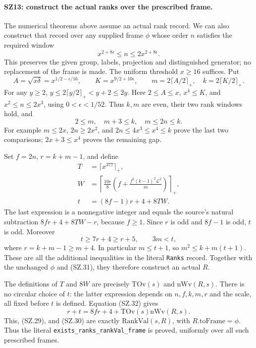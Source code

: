 \documentclass[11pt,a4paper]{article}
\numberwithin{equation}{section}
\theoremstyle{remark}\newtheorem{remark}[theorem]{Remark}
\begin{document}
\paragraph{SZ13: construct the actual ranks over the prescribed frame.}
The numerical theorems above assume an actual rank record. We can also
construct that record over any supplied frame $\phi$ whose order $n$
satisfies the required window
\[
             x^{2+8\epsilon}\leq n\leq2x^{2+8\epsilon}.
                                                                    \tag{SZ.29}
\]
This preserves the given group, labels, projection and distinguished
generator; no replacement of the frame is made. The uniform threshold
$x\geq16$ suffices. Put
\[
 A=\sqrt{x\delta}=x^{1/2-\epsilon/16},\qquad
 K=x^{9/2+10\epsilon},\qquad
          m=2\lceil A/2\rceil_+,\quad k=2\lceil K/2\rceil_+.
                                                                    \tag{SZ.30}
\]
For any $y\geq2$, $y\leq2\lceil y/2\rceil_+<y+2\leq2y$.
Here $2\leq A\leq x$, $x^4\leq K$, and
$x^2\leq n\leq2x^3$, using $0<\epsilon<1/52$.
Thus $k,m$ are even, their two rank windows hold, and
\[
       2\leq m,\quad m+3\leq k,\quad m\leq2n\leq k.
                                                                    \tag{SZ.31}
\]
For example $m\leq2x$, $2n\geq2x^2$, and
$2n\leq4x^3\leq x^4\leq k$ prove the last two comparisons;
$2x+3\leq x^4$ proves the remaining gap.

Set $f=2n$, $r=k+m-1$, and define
\[
 \begin{split}
 T&=\lceil x^{377}\rceil_+,\\
 W&=\left\lceil\frac{10r}{8}
       \left(f+\frac{f^2(k-1)^3\mathcal L^2}{m}\right)
                                                    \right\rceil_+,\\
 t&=(8f-1)r+4+8TW.
 \end{split}                                                    \tag{SZ.32}
\]
The last expression is a nonnegative integer and equals the source's
natural subtraction $8fr+4+8TW-r$, because $f\geq1$.
Since $r$ is odd and $8f-1$ is odd, $t$ is odd. Moreover
\[
             t\geq7r+4\geq r+5,\qquad 3m<t,
\]
where $r=k+m-1\geq m+4$. In particular $m\leq t+1$, so
$m^2\leq k+m(t+1)$. These are all the additional inequalities
in the literal \texttt{Ranks} record. Together with the unchanged
$\phi$ and (SZ.31), they therefore construct an actual $R$.

The definitions of $T$ and $8W$ are precisely $\mathrm{TOv}(s)$ and
$\mathrm{nWv}(R,s)$. There is no circular choice of $t$: the latter
expression depends on $n,f,k,m,r$ and the scale, all fixed before
$t$ is defined. Equation (SZ.32) gives
\[
             r+t=8fr+4+\mathrm{TOv}(s)\mathrm{nWv}(R,s).
                                                                    \tag{SZ.33}
\]
This, (SZ.29), and (SZ.30) are exactly
$\mathrm{RankVal}(s,R)$, with $R.\mathrm{toFrame}=\phi$.
Thus the literal \texttt{exists\_\allowbreak ranks\_\allowbreak rankVal\_\allowbreak frame} is
proved, uniformly over all such prescribed frames.
\end{document}
